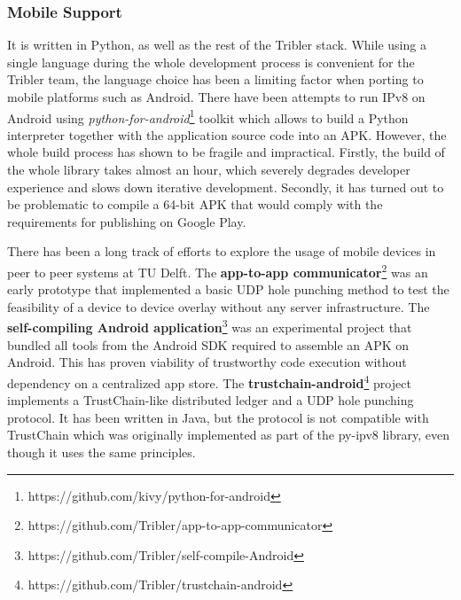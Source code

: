 
\subsubsection{Mobile Support}

It is written in Python, as well as the rest of the Tribler stack. While using a single language during the whole development process is convenient for the Tribler team, the language choice has been a limiting factor when porting to mobile platforms such as Android. There have been attempts to run IPv8 on Android using \textit{python-for-android}\footnote{https://github.com/kivy/python-for-android} toolkit which allows to build a Python interpreter together with the application source code into an APK. However, the whole build process has shown to be fragile and impractical. Firstly, the build of the whole library takes almost an hour, which severely degrades developer experience and slows down iterative development. Secondly, it has turned out to be problematic to compile a 64-bit APK that would comply with the requirements for publishing on Google Play.

There has been a long track of efforts to explore the usage of mobile devices in peer to peer systems at TU Delft. The \textbf{app-to-app communicator}\footnote{https://github.com/Tribler/app-to-app-communicator} was an early prototype that implemented a basic UDP hole punching method to test the feasibility of a device to device overlay without any server infrastructure. The \textbf{self-compiling Android application}\footnote{https://github.com/Tribler/self-compile-Android} was an experimental project that bundled all tools from the Android SDK required to assemble an APK on Android. This has proven viability of trustworthy code execution without dependency on a centralized app store. The \textbf{trustchain-android}\footnote{https://github.com/Tribler/trustchain-android} project implements a TrustChain-like distributed ledger and a UDP hole punching protocol. It has been written in Java, but the protocol is not compatible with TrustChain which was originally implemented as part of the py-ipv8 library, even though it uses the same principles. %

